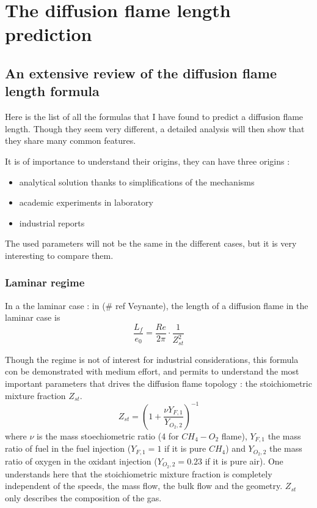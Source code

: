 \renewcommand\evenpagerightmark{{\scshape\small The diffusion flame length prediction}}
\chapter[The diffusion flame length prediction]%
{The diffusion flame length prediction}
\label{The diffusion flame length prediction}
\section{An extensive review of the diffusion flame length formula }

Here is the list of all the formulas that I have found to predict a diffusion flame length. Though they seem very different, a detailed analysis will then show that they share many common features.

It is of importance to understand their origins, they can have three origins :
\begin{itemize}
\item analytical solution thanks to simplifications of the mechanisms
\item academic experiments in laboratory
\item industrial reports 
\end{itemize}

The used parameters will not be the same in the different cases, but it is very interesting to compare them.

\subsection{Laminar regime}
In a the laminar case : in (\# ref Veynante), the length of a diffusion flame in the laminar case is 
\begin{equation} \label{eq:length_laminar}
\frac{L_{f}}{e_{0}}=\frac{Re}{2\pi}\cdot \frac{1}{Z_{st}^2}
\end{equation}

  Though the regime is not of interest for industrial considerations, this formula con be demonstrated with medium effort, and permits to understand the most important parameters that drives the diffusion flame topology : the stoichiometric mixture fraction $Z_{st}$.
  \begin{equation}
Z_{st}=(1+\frac{\nu Y_{F,1}}{Y_{O_{2},2}})^{-1}
\end{equation}
  where $\nu$ is the mass stoechiometric ratio (4 for $CH_{4}-O_{2}$ flame),    $Y_{F,1}$ the mass ratio of fuel in the fuel injection ($Y_{F,1}=1$ if it is pure $CH_{4}$) and $Y_{O_{2},2}$ the mass ratio of oxygen in the oxidant injection ($Y_{O_{2},2}=0.23$ if it is pure air). One understands here that the stoichiometric mixture fraction is completely independent of the speeds, the mass flow, the bulk flow and the geometry. $Z_{st}$ only describes the composition of the gas. 

